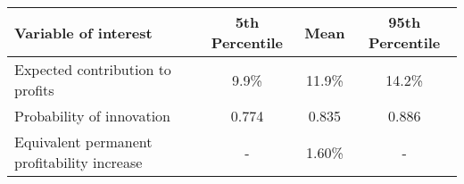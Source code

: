 
    \begin{tabular}{lccc} \\ 
        \hline 
        Variable of interest & 5th Percentile & Mean & 95th Percentile  \\ 
        \hline 
        Expected contribution to profits &  9.9\% & 11.9\% & 14.2\% \\ 
        Probability of innovation & 0.774 & 0.835 & 0.886 \\ 
        Equivalent permanent profitability increase & - & 1.60\% & - \\ 
        \hline 
    \end{tabular} 
